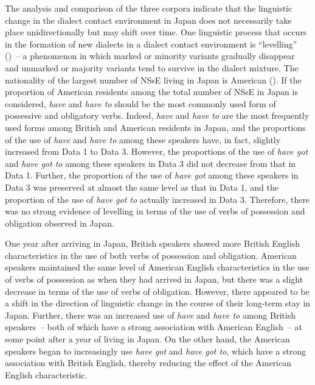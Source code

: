 \documentclass[output=paper,colorlinks,citecolor=brown]{langscibook}
\begin{document}
The analysis and comparison of the three corpora indicate that the linguistic change in the dialect contact environment in Japan does not necessarily take place unidirectionally but may shift over time. One linguistic process that occurs in the formation of new dialects in a dialect contact environment is “levelling” (\cites[149--150]{Britain2018}[98--102]{Trudgill1986})~--  a phenomenon in which marked or minority variants gradually disappear and unmarked or majority variants tend to survive in the dialect mixture. The nationality of the largest number of NSsE living in Japan is American (\citealt{eStat2021}). If the proportion of American residents among the total number of NSsE in Japan is considered, \textit{have} and \textit{have to} should be the most commonly used form of possessive and obligatory verbs. Indeed, \textit{have} and \textit{have to} are the most frequently used forms among British and American residents in Japan, and the proportions of the use of \textit{have} and \textit{have to} among these speakers have, in fact, slightly increased from Data 1 to Data 3. However, the proportions of the use of \textit{have got} and \textit{have got to} among these speakers in Data 3 did not decrease from that in Data 1. Further, the proportion of the use of \textit{have got} among these speakers in Data 3 was preserved at almost the same level as that in Data 1, and the proportion of the use of \textit{have got to} actually increased in Data 3. Therefore, there was no strong evidence of levelling in terms of the use of verbs of possession and obligation observed in Japan.

One year after arriving in Japan, British speakers showed more British English characteristics in the use of both verbs of possession and obligation. American speakers maintained the same level of American English characteristics in the use of verbs of possession as when they had arrived in Japan, but there was a slight decrease in terms of the use of verbs of obligation. However, there appeared to be a shift in the direction of linguistic change in the course of their long-term stay in Japan. Further, there was an increased use of \textit{have} and \textit{have to} among British speakers~– both of which have a strong association with American English~– at some point after a year of living in Japan. On the other hand, the American speakers began to increasingly use \textit{have got} and \textit{have got to}, which have a strong association with British English, thereby reducing the effect of the American English characteristic.
\end{document}
